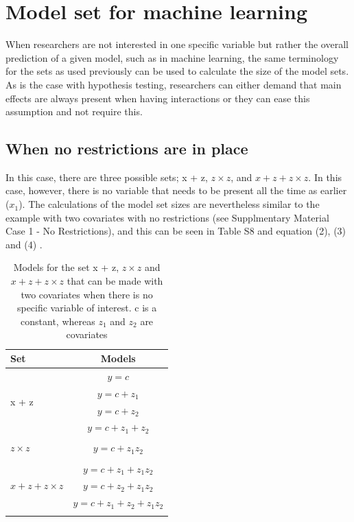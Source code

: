 




\section{Model set for machine learning}
When researchers are not interested in one specific variable but rather the overall prediction of a given model, such as in machine learning, the same terminology for the sets as used previously can be used to calculate the size of the model sets. 
As is the case with hypothesis testing, researchers can either demand that main effects are always present when having interactions or they can ease this assumption and not require this. \\

\subsection{When no restrictions are in place}
In this case, there are three possible sets; x + z, $z \times z$, and $x + z + z \times z$. In this case, however, there is no variable that needs to be present all the time as earlier ($x_1$). The calculations of the model set sizes are nevertheless similar to the example with two covariates with no restrictions (see Supplmentary Material Case 1 - No Restrictions), and this can be seen in Table S8 and equation (2), (3) and (4) .  

\begin{table}
\caption{Models for the set x + z, $z \times z$ and $x + z + z \times z$ that can be made with two covariates when there is no specific variable of interest. c is a constant, whereas $z_1$ and $z_2$ are covariates}
\centering
\begin{tabular}{lc} 
\toprule
Set & Models \\ 
\midrule
\multirow{4}{*}{x + z} & $y=c$\\ & $y=c + z_1$\\ & $y=c + z_2$\\ & $y=c + z_1 + z_2$\\ &  \\  
\multirow{1}{*}{$z \times z$} & $y=c + z_1z_2$\\  & \\ 
\multirow{3}{*}{$x + z + z \times z$}  & $y=c + z_1 + z_1z_2$\\ & $y=c + z_2 + z_1z_2$\\ & $y=c + z_1 + z_2 + z_1z_2$\\ &  \\  
\bottomrule
\end{tabular}
\end{table}

